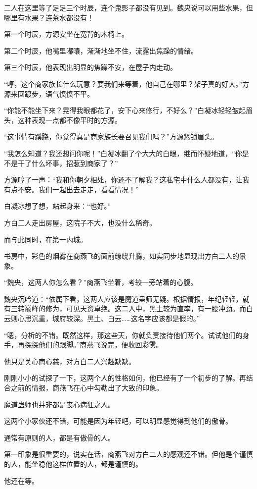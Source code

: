 \begin{this_body}
二人在这里等了足足三个时辰，连个鬼影子都没有见到。魏央说可以用些水果，但哪里有水果？连茶水都没有！

第一个时辰，方源安坐在宽背的木椅上。

第二个时辰，他嘴里嘟囔，渐渐地坐不住，流露出焦躁的情绪。

第三个时辰，他表现出明显的焦躁不安，在屋子内走动。

“哼，这个商家族长什么玩意？要我们来等着，他自己在哪里？架子真的好大。”方源来回踱步，语气愤愤不平。

“你能不能坐下来？晃得我眼都花了，安下心来修行，不好么？”白凝冰轻轻皱起眉头，这种表现一点都不像平时的方源。

“这事情有蹊跷，你觉得真是商家族长要召见我们吗？”方源紧锁眉头。

“我怎么知道？我还想问你呢！”白凝冰翻了个大大的白眼，继而怀疑地道，“你是不是干了什么坏事，招惹到商家了？”

方源哼了一声：“我和你朝夕相处，你还不了解我？这私宅中什么人都没有，让我有点不安。我们一起出去走走，看看情况！”

白凝冰想了想，站起身来：“也好。”

方白二人走出房屋，这院子不大，也没什么稀奇。

而与此同时，在第一内城。

书房中，彩色的烟雾在商燕飞的面前缭绕升腾，如实同步地显现出方白二人的景象。

“魏央，这两人你怎么看？”商燕飞坐着，考较一旁站着的心腹。

魏央沉吟道：“依属下看，这两人应该是魔道蛊师无疑。根据情报，年纪轻轻，就有三转巅峰的修为，可见天资卓绝。这二人中，黑土较为直率，有一股冲劲。而白云则心思沉重，城府较深。黑土、白云……这名字应该都是假的。”

“嗯，分析的不错。既然这样，那这些天，你就负责接待他们两个。试试他们的身手，再探探他们的跟脚。”商燕飞说完，便收回彩雾。

他只是关心商心慈，对方白二人兴趣缺缺。

刚刚小小的试探了一下，这两个人的性格如何，他已经有了一个初步的了解。再结合之前的情报，商燕飞在心中勾勒出了大致的印象。

魔道蛊师也并非都是丧心病狂之人。

这两个小家伙还不错，可能是因为年轻吧，可以明显感觉得到他们的傲骨。

通常有原则的人，都是有傲骨的人。

第一印象是很重要的，说实在话，商燕飞对方白二人的感观还不错。但他是个谨慎的人，能坐稳他这样位置的人，都是谨慎的。

他还在等。


\end{this_body}
